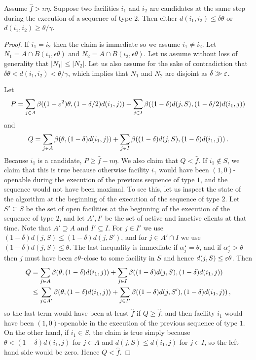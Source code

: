 \begin{lemma}
\label{lem:structure-robust}
    Assume $\hat{f} > n \eta$.
    Suppose two facilities $i_1$ and $i_2$ are candidates at the same step during the execution of a sequence of type $2$.
    Then either
    $d(i_1,i_2)\le \delta \theta$ or $d(i_1,i_2)\ge \theta / \gamma$.
\end{lemma}
\begin{proof}
If $i_1 = i_2$ then the claim is immediate so we assume $i_1 \neq i_2$.
Let $N_1 = A \cap B(i_1, \epsilon \theta)$ and $N_2 = A \cap B(i_2, \epsilon \theta)$.
Let us assume without loss of generality that $|N_1| \le |N_2|$.
Let us also assume for the sake of contradiction that $\delta \theta < d(i_1, i_2) < \theta/\gamma$, which implies that $N_1$ and $N_2$ are disjoint as $\delta \gg \varepsilon$.

Let 
\[P = \sum_{j\in A}\beta((1+\varepsilon^2) \theta, (1- \delta/2)d(i_1,j)) +
\sum_{j\in I}\beta((1-\delta)d(j,S), (1-\delta/2)d(i_1,j))\]
and 
\[Q = \sum_{j\in A}\beta(\theta, (1-\delta)d(i_1,j)) +\sum_{j\in I}\beta((1-\delta)d(j,S), (1-\delta)d(i_1,j))\,.\]
Because $i_1$ is a candidate, $P \geq \hat f - n \eta$.
We also claim that $Q < \hat f$.
If $i_1 \not\in S$, we claim that this is true because otherwise facility $i_1$ would have been $(1,0)$-openable during the execution of the previous sequence of type $1$, and the sequence would not have been maximal.
To see this, let us inspect the state of the algorithm at the beginning of the execution of the sequence of type $2$.
Let $S' \subseteq S$ be the set of open facilities at the beginning of the execution of the sequence of type $2$, and let $A', I'$ be the set of active and inactive clients at that time.
Note that $A' \supseteq A$ and $I' \subseteq I$.
For $j \in I'$ we use $(1-\delta) d(j,S) \leq (1-\delta) d(j, S')$, and for $j \in A' \cap I$ we use $(1-\delta) d(j,S) \leq \theta$.
The last inequality is immediate if $\alpha_j^\star = \theta$, and if $\alpha_j^\star > \theta$ then $j$ must have been $\varepsilon \theta$-close to some facility in $S$ and hence $d(j,S) \leq \varepsilon\theta$.
Then
\begin{align*}
Q &= \sum_{j\in A}\beta(\theta, (1- \delta)d(i_1,j)) +
\sum_{j\in I}\beta((1-\delta)d(j,S), (1-\delta)d(i_1,j))\\
&\leq \sum_{j\in A'}\beta(\theta, (1- \delta)d(i_1,j)) +
\sum_{j\in I'}\beta((1-\delta)d(j,S'), (1-\delta)d(i_1,j))\,,
\end{align*}
so the last term would have been at least $\hat f$ if $Q \geq \hat f$, and then facility $i_1$ would have been $(1,0)$-openable in the execution of the previous sequence of type $1$.
On the other hand, if $i_1 \in S$, the claim is true simply because $\theta < (1-\delta) d(i_1, j)$ for $j \in A$ and $d(j, S) \leq d(i_1, j)$ for $j \in I$, so the left-hand side would be zero.
Hence $Q < \hat f$.


\end{proof}
